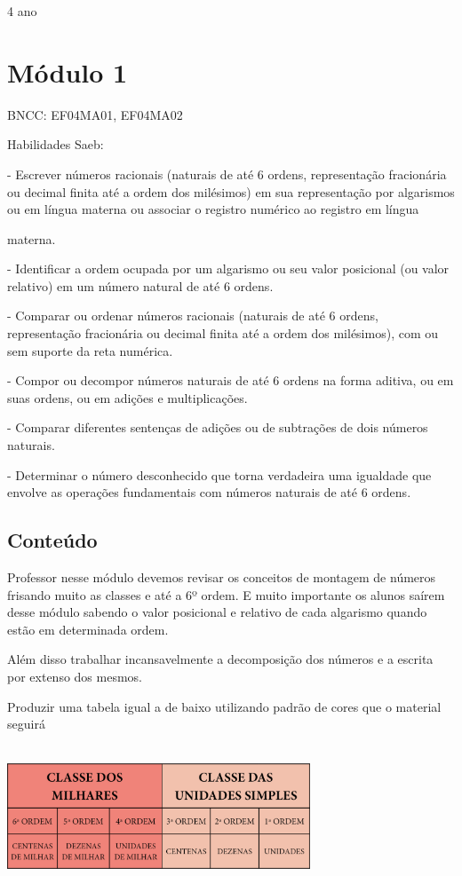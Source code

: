\protect\hypertarget{_Hlk129432535}{}{}4 ano

\section{Módulo 1}\label{muxf3dulo-1}

BNCC: EF04MA01, EF04MA02

Habilidades Saeb:

- Escrever números racionais (naturais de até 6 ordens, representação
fracionária ou decimal finita até a ordem dos milésimos) em sua
representação por algarismos ou em língua materna ou associar o registro
numérico ao registro em língua

materna.

- Identificar a ordem ocupada por um algarismo ou seu valor posicional
(ou valor relativo) em um número natural de até 6 ordens.

- Comparar ou ordenar números racionais (naturais de até 6 ordens,
representação fracionária ou decimal finita até a ordem dos milésimos),
com ou sem suporte da reta numérica.

- Compor ou decompor números naturais de até 6 ordens na forma aditiva,
ou em suas ordens, ou em adições e multiplicações.

- Comparar diferentes sentenças de adições ou de subtrações de dois
números naturais.

- Determinar o número desconhecido que torna verdadeira uma igualdade
que envolve as operações fundamentais com números naturais de até 6
ordens.

\subsection{Conteúdo}\label{conteuxfado}

Professor nesse módulo devemos revisar os conceitos de montagem de
números frisando muito as classes e até a 6º ordem. E muito importante
os alunos saírem desse módulo sabendo o valor posicional e relativo de
cada algarismo quando estão em determinada ordem.

Além disso trabalhar incansavelmente a decomposição dos números e a
escrita por extenso dos mesmos.

Produzir uma tabela igual a de baixo utilizando padrão de cores que o
material seguirá

\includegraphics[width=3.55128in,height=1.66618in]{media/image1.png}

